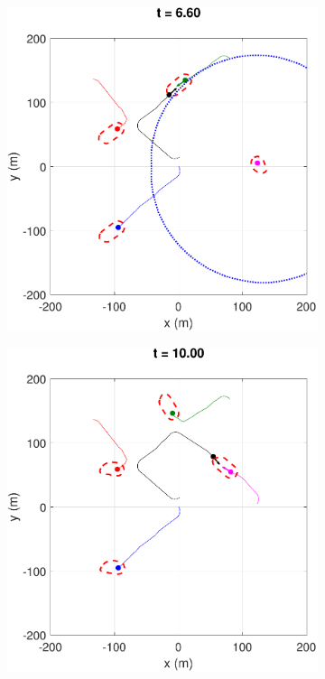 \begin{figure}
\begin{subfigure}{.5\columnwidth}
  \subcaption{}
  \label{fig:worstcase2}
\end{subfigure}
\begin{subfigure}{.5\columnwidth}
  \centering
  \includegraphics[width=\columnwidth]{figs/simulate_bufferRegion_properties_worst_3}
  \subcaption{}
  \label{fig:worstcase3}
\end{subfigure}%
\begin{subfigure}{.5\columnwidth}
  \centering
  \includegraphics[width=\columnwidth]{figs/simulate_bufferRegion_properties_worst_4}

\end{subfigure}
\end{figure}
